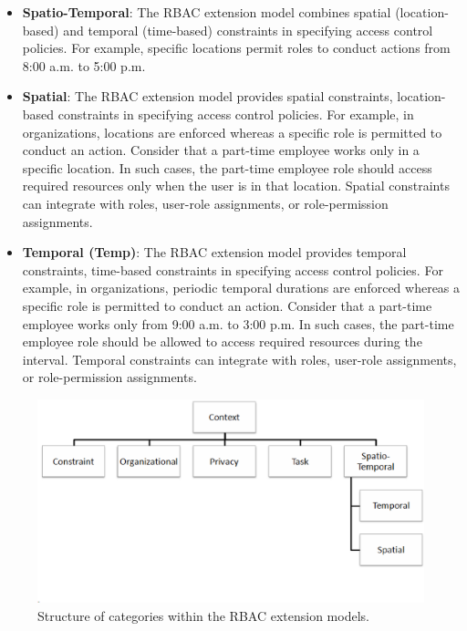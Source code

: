 \begin{itemize}
  \item \textbf{Spatio-Temporal}: The RBAC extension model combines spatial (location-based) and temporal (time-based) constraints in specifying access control policies. For example, specific locations permit roles to conduct actions from 8:00 a.m. to 5:00 p.m.

  \item \textbf{Spatial}: The RBAC extension model provides spatial constraints, location-based constraints in specifying access
	control policies. For example, in organizations, locations are enforced whereas a
	specific role is permitted to conduct an action. Consider that a part-time employee works only in a specific location.
	In such cases, the part-time employee role should access required resources only when the user is in that location. 
	Spatial constraints can integrate with roles, user-role assignments, or role-permission assignments. 

  \item \textbf{Temporal (Temp)}:  The RBAC extension model provides temporal constraints, time-based constraints in specifying access
	control policies. For example, in organizations, periodic temporal durations are enforced whereas a
	specific role is permitted to conduct an action. Consider that a part-time employee works only from 9:00 a.m. to 3:00 p.m.
	In such cases, the part-time employee role should be allowed to access required resources during the interval. 
	Temporal constraints can integrate with roles, user-role assignments, or role-permission assignments.   
	
\end{itemize}

\begin{figure}[ht]
    \centering
        \includegraphics[width=6.0in]{sections/category_structrure.eps}
\vspace{-0.7 in}
    \caption{\label{fig:category_structrure}Structure of categories within the RBAC extension models.}
\end{figure}

